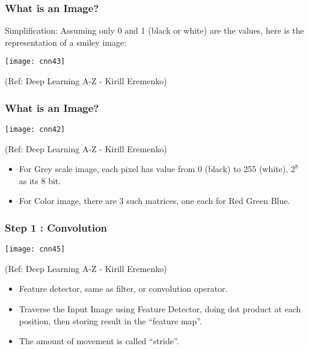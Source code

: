 \begin{frame}[fragile] \frametitle{What is an Image?}
Simplification: Assuming only 0 and 1 (black or white) are the values, here is the representation of a smiley image:

\begin{center}
\texttt{[image: cnn43]}

\tiny{(Ref: Deep Learning A-Z - Kirill Eremenko)}
\end{center}



\end{frame}



\begin{frame}[fragile] \frametitle{What is an Image?}

\begin{center}
\texttt{[image: cnn42]}

\tiny{(Ref: Deep Learning A-Z - Kirill Eremenko)}
\end{center}

\begin{itemize}
\item For Grey scale image, each pixel has value from 0 (black) to 255 (white), $2^8$ as its 8 bit.
\item For Color image, there are 3 such matrices, one each for Red Green Blue.
\end{itemize}


\end{frame}


\begin{frame}[fragile] \frametitle{Step 1 : Convolution}

\begin{center}
\texttt{[image: cnn45]}

\tiny{(Ref: Deep Learning A-Z - Kirill Eremenko)}
\end{center}

\begin{itemize}
\item Feature detector, same as filter, or convolution operator.
\item Traverse the Input Image using Feature Detector, doing dot product at each position, then storing result in the ``feature map''.
\item The amount of movement is called ``stride''.
\end{itemize}
\end{frame}

